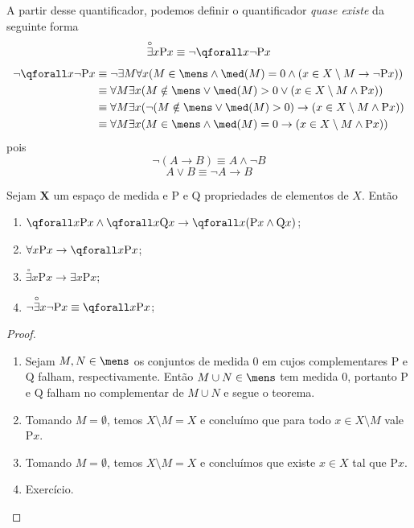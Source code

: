A partir desse quantificador, podemos definir o quantificador \emph{quase existe} da seguinte forma
	\begin{equation*}
	\overset{\circ}{\exists}x \mathrm{P}x \equiv \neg \qforall x \neg \mathrm{P}x
	\end{equation*}
	\begin{align*}
	\neg\qforall x \neg\mathrm{P}x &\equiv \neg\exists M \forall x (M \in \mens \wedge \med(M)=0 \wedge (x \in X \setminus M \rightarrow \neg\mathrm{P}x)) \\	
	&\equiv \forall M \exists x (M \notin \mens \vee \med(M)>0 \vee (x \in X \setminus M \wedge \mathrm{P}x)) \\
	&\equiv \forall M \exists x (\neg(M \notin \mens \vee \med(M)>0) \rightarrow (x \in X \setminus M \wedge \mathrm{P}x)) \\
	&\equiv \forall M \exists x (M \in \mens \wedge \med(M)=0 \rightarrow (x \in X \setminus M \wedge \mathrm{P}x)) \\
	\end{align*}
pois
	\begin{equation*}
	\neg(A \rightarrow B) \equiv A \wedge \neg B
	\end{equation*}
	\begin{equation*}
	A \vee B \equiv \neg A \rightarrow B
	\end{equation*}

\begin{prop}
Sejam $\bm X$ um espaço de medida e $\mathrm{P}$ e $\mathrm{Q}$ propriedades de elementos de $X$. Então
	\begin{enumerate}
	\item $\qforall x \mathrm{P}x \wedge \qforall x \mathrm{Q}x \rightarrow \qforall x (\mathrm{P}x \wedge \mathrm{Q}x)$;
	\item $\forall x \mathrm{P}x \rightarrow \qforall x \mathrm{P}x$;
	\item $\overset{\circ}{\exists} x \mathrm{P}x \rightarrow \exists x \mathrm{P}x$;
	\item $\neg \overset{\circ}{\exists}x \neg\mathrm{P}x \equiv \qforall x \mathrm{P}x$;
	\end{enumerate}
\end{prop}
\begin{proof}
	\begin{enumerate}
	\item Sejam $M,N \in \mens$ os conjuntos de medida $0$ em cujos complementares $\mathrm{P}$ e $\mathrm{Q}$ falham, respectivamente. Então $M \cup N \in \mens$ tem medida $0$, portanto $\mathrm{P}$ e $\mathrm{Q}$ falham no complementar de $M \cup N$ e segue o teorema.
	
	\item Tomando $M=\emptyset$, temos $X \setminus M = X$ e concluímo que para todo $x \in X \setminus M$ vale $\mathrm{P}x$.
	
	\item Tomando $M=\emptyset$, temos $X \setminus M = X$ e concluímos que existe $x \in X$ tal que $\mathrm{P}x$.
	
	\item Exercício.
	\end{enumerate}
\end{proof}

